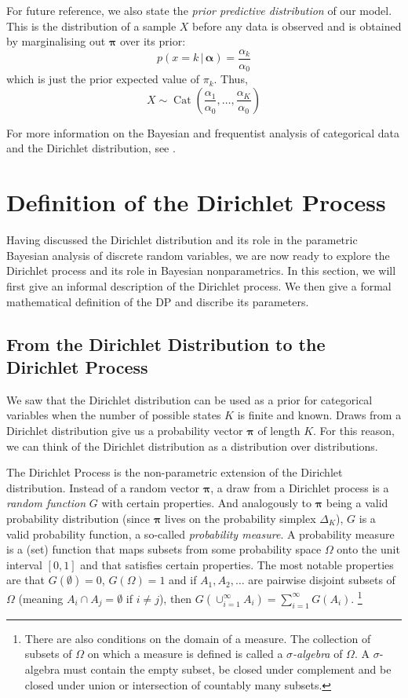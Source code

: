\documentclass[final,3p,times,twocolumn]{elsarticle}
\DeclareMathOperator*{\Cat}{Cat}
\let\bs\boldsymbol
\begin{document}
For future reference, we also state the \emph{prior predictive distribution} of our model.
This is the distribution of a sample $X$ before any data is observed and is obtained by marginalising out $\bs \pi$ over its prior:
\begin{equation}
\label{eqn:dirpriorpredictive}
p(x = k\,|\,\bs \alpha) = \frac{\alpha_k}{\alpha_0}
\end{equation}
which is just the prior expected value of $\pi_k$.
Thus,
\begin{equation}
X \sim \Cat(\frac{\alpha_1}{\alpha_0},\dots,\frac{\alpha_K}{\alpha_0})
\end{equation}

For more information on the Bayesian and frequentist analysis of categorical data and the Dirichlet distribution, see \cite{Bishop, Murphy}.


\section{Definition of the Dirichlet Process}
\label{sect:dp}
Having discussed the Dirichlet distribution and its role in the parametric Bayesian analysis of discrete random variables, we are now ready to explore the Dirichlet process and its role in Bayesian nonparametrics.
In this section, we will first give an informal description of the Dirichlet process.
We then give a formal mathematical definition of the DP and discribe its parameters.

\subsection{From the Dirichlet Distribution to the Dirichlet Process}
We saw that the Dirichlet distribution can be used as a prior for categorical variables when the number of possible states $K$ is finite and known. Draws from a Dirichlet distribution give us a probability vector $\bs \pi$ of length $K$. For this reason, we can think of the Dirichlet distribution as a distribution over distributions.

The Dirichlet Process is the non-parametric extension of the Dirichlet distribution.
Instead of a random vector $\bs \pi$, a draw from a Dirichlet process is a \emph{random function} $G$ with certain properties.
And analogously to $\bs \pi$ being a valid probability distribution (since $\bs \pi$ lives on the probability simplex $\Delta_K$), $G$ is a valid probability function, a so-called \emph{probability measure}.
A probability measure is a (set) function that maps subsets from some probability space $\Omega$ onto the unit interval $[0,1]$ and that satisfies certain properties.
The most notable properties are that $G(\emptyset)=0$, $G(\Omega)=1$ and if $A_1,A_2,\dots$ are pairwise disjoint subsets of $\Omega$ (meaning $A_i\cap A_j = \emptyset$ if $i\neq j$), then $G(\cup_{i=1}^\infty A_i) = \sum_{i=1}^\infty G(A_i)$.
\footnote{There are also conditions on the domain of a measure.
The collection of subsets of $\Omega$ on which a measure is defined is called a \emph{$\sigma$-algebra} of $\Omega$.
A $\sigma$-algebra must contain the empty subset, be closed under complement and be closed under union or intersection of countably many subsets.}
\end{document}
